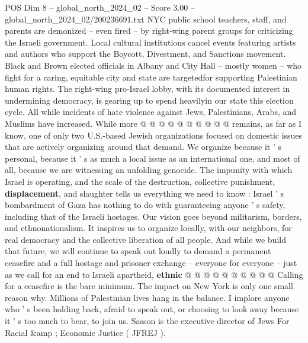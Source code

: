 \begin{textsample}{POS Dim 8 – global\_north\_2024\_02 – Score 3.00 – global\_north\_2024\_02/200236691.txt}
NYC public school teachers, staff, and parents are demonized -- even fired -- by right-wing parent groups for criticizing the Israeli government.
Local cultural institutions cancel events featuring artists and authors who support the Boycott, Divestment, and Sanctions movement.
Black and Brown elected officials in Albany and City Hall -- mostly women -- who fight for a caring, equitable city and state are targetedfor supporting Palestinian human rights.
The right-wing pro-Israel lobby, with its documented interest in undermining democracy, is gearing up to spend heavilyin our state this election cycle.
All while incidents of hate violence against Jews, Palestinians, Arabs, and Muslims have increased.
While more @ @ @ @ @ @ @ @ @ @ remains, as far as I know, one of only two U.S.-based Jewish organizations focused on domestic issues that are actively organizing around that demand.
We organize because it ' s personal, because it ' s as much a local issue as an international one, and most of all, because we are witnessing an unfolding genocide.
The impunity with which Israel is operating, and the scale of the destruction, collective punishment, \textbf{displacement}, and slaughter tells us everything we need to know : Israel ' s bombardment of Gaza has nothing to do with guaranteeing anyone ' s safety, including that of the Israeli hostages.
Our vision goes beyond militarism, borders, and ethnonationalism.
It inspires us to organize locally, with our neighbors, for real democracy and the collective liberation of all people.
And while we build that future, we will continue to speak out loudly to demand a permanent ceasefire and a full hostage and prisoner exchange -- everyone for everyone -- just as we call for an end to Israeli apartheid, \textbf{ethnic} @ @ @ @ @ @ @ @ @ @ Calling for a ceasefire is the bare minimum.
The impact on New York is only one small reason why.
Millions of Palestinian lives hang in the balance.
I implore anyone who ' s been holding back, afraid to speak out, or choosing to look away because it ' s too much to bear, to join us.
Sasson is the executive director of Jews For Racial \&amp ; Economic Justice ( JFREJ ).

\end{textsample}
